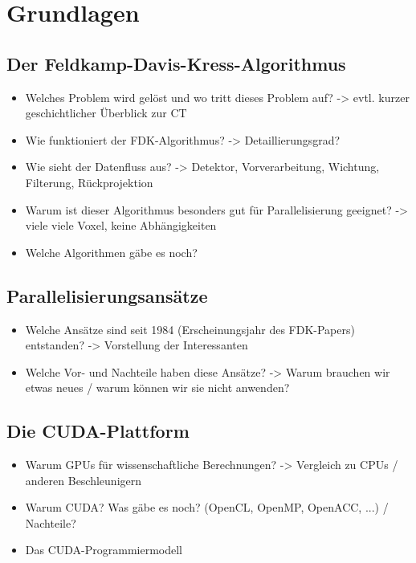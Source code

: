 \chapter{Grundlagen}

\section{Der Feldkamp-Davis-Kress-Algorithmus}

\begin{itemize}
    \item Welches Problem wird gelöst und wo tritt dieses Problem auf? -> evtl. kurzer geschichtlicher Überblick zur CT
    \item Wie funktioniert der FDK-Algorithmus? -> Detaillierungsgrad?
    \item Wie sieht der Datenfluss aus? -> Detektor, Vorverarbeitung, Wichtung, Filterung, Rückprojektion
    \item Warum ist dieser Algorithmus besonders gut für Parallelisierung geeignet? -> viele viele Voxel, keine Abhängigkeiten
    \item Welche Algorithmen gäbe es noch?
\end{itemize}

\section{Parallelisierungsansätze}

\begin{itemize}
    \item Welche Ansätze sind seit 1984 (Erscheinungsjahr des FDK-Papers) entstanden? -> Vorstellung der Interessanten
    \item Welche Vor- und Nachteile haben diese Ansätze? -> Warum brauchen wir etwas neues / warum können wir sie nicht anwenden?
\end{itemize}


\section{Die CUDA-Plattform}

\begin{itemize}
    \item Warum GPUs für wissenschaftliche Berechnungen? -> Vergleich zu CPUs / anderen Beschleunigern
    \item Warum CUDA? Was gäbe es noch? (OpenCL, OpenMP, OpenACC, ...) / Nachteile?
    \item Das CUDA-Programmiermodell
\end{itemize}
